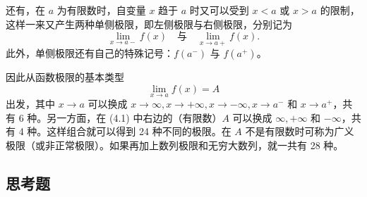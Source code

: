 还有，在 $a$ 为有限数时，自变量 $x$ 趋于 $a$ 时又可以受到 $x<a$ 或 $x>a$ 的限制，这样一来又产生两种单侧极限，即左侧极限与右侧极限，分别记为
\[
  \lim_{x\to a-}f(x)\quad\text{与}\quad\lim_{x\to a+}f(x).
\]
此外，单侧极限还有自己的特殊记号：$f(a^-)$ 与 $f(a^+)$。

因此从函数极限的基本类型
\begin{equation}
  \lim_{x\to a}f(x)=A
  \tag{4.1}
  \label{eq:4.1}
\end{equation}
出发，其中 $x\to a$ 可以换成 $x\to\infty,x\to+\infty,x\to-\infty,x\to a^-$ 和 $x\to a^+$，共有 6 种。另一方面，在 (4.1) 中右边的（有限数）$A$ 可以换成 $\infty,+\infty$ 和 $-\infty$，共有 4 种。这样组合就可以得到 24 种不同的极限。在 $A$ 不是有限数时可称为广义极限（或非正常极限）。如果再加上数列极限和无穷大数列，就一共有 28 种。

\subsection{思考题}

